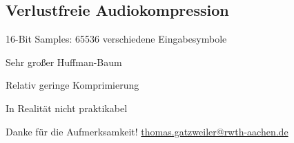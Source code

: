 \documentclass[xcolor=dvipsnames,presentation]{beamer}    %
\makeatletter
\renewcommand*{\email}{\url{thomas.gatzweiler@rwth-aachen.de}}
\newenvironment{witemize}{\itemize\setlength{\itemsep}{1em}}{\enditemize}
\makeatother
\begin{document}
\subsection{Verlustfreie Audiokompression}
\begin{frame}[<+->]{\insertsection}
\begin{witemize}
\item 16-Bit Samples: 65536 verschiedene Eingabesymbole
\item Sehr großer Huffman-Baum
\item Relativ geringe Komprimierung
\item In Realität nicht praktikabel
\end{witemize}
\end{frame}


\begin{frame}[label=finalSlide]
  \label{LastPage}
  \begin{center}
    \vfill
    {\Large
    \textcolor{i6blue}{Danke für die Aufmerksamkeit!}
    }
     \vfill
     \inserttitle
    \vfill
    {\Large \insertauthor}
    \vfill
    \email{}
  \end{center}
\end{frame}
\end{document}

